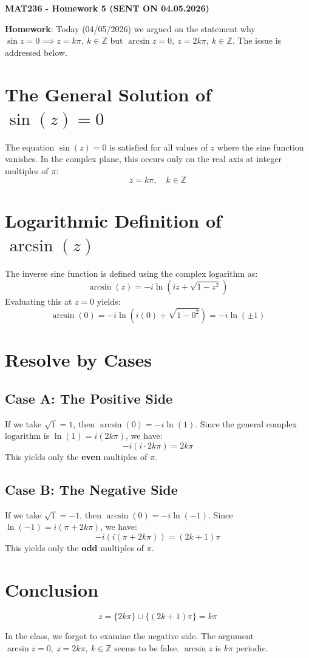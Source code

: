 \documentclass[11pt]{article}
\begin{document}
\begin{center}
\large
\textbf{MAT236 - Homework 5 (SENT ON 04.05.2026)}
\end{center}

\noindent\textbf{Homework}: Today (04/05/2026) we argued on the statement why $\sin z=0\implies z=k\pi,\:k\in\mathbb{Z}$ but $\arcsin z=0,\:z=2k\pi,\:k\in\mathbb{Z}$. The issue is addressed below.

\section{The General Solution of $\sin(z) = 0$}
The equation $\sin(z) = 0$ is satisfied for all values of $z$ where the sine function vanishes. In the complex plane, this occurs only on the real axis at integer multiples of $\pi$:
\begin{equation*}
z = k\pi, \quad k \in \mathbb{Z}
\end{equation*}

\section{Logarithmic Definition of $\arcsin(z)$}
The inverse sine function is defined using the complex logarithm as:
\begin{equation*}
\arcsin(z) = -i \ln\left(iz + \sqrt{1 - z^2}\right)
\end{equation*}
Evaluating this at $z = 0$ yields:
\begin{equation*}
\arcsin(0) = -i \ln\left(i(0) + \sqrt{1 - 0^2}\right) = -i \ln(\pm 1)
\end{equation*}

\section{Resolve by Cases}

\subsection{Case A: The Positive Side}
If we take $\sqrt{1} = 1$, then $\arcsin(0) = -i \ln(1)$. Since the general complex logarithm is $\ln(1) = i(2k\pi)$, we have:
\begin{equation*}
-i(i \cdot 2k\pi) = 2k\pi
\end{equation*}
This yields only the \textbf{even} multiples of $\pi$.

\subsection{Case B: The Negative Side}
If we take $\sqrt{1} = -1$, then $\arcsin(0) = -i \ln(-1)$. Since $\ln(-1) = i(\pi + 2k\pi)$, we have:
\begin{equation*}
-i(i(\pi + 2k\pi)) = (2k + 1)\pi
\end{equation*}
This yields only the \textbf{odd} multiples of $\pi$.

\section{Conclusion}
\begin{equation*}
z = \{2k\pi\} \cup \{(2k+1)\pi\} = k\pi
\end{equation*}

\noindent In the class, we forgot to examine the negative side. The argument $\arcsin z=0,\:z=2k\pi,\:k\in\mathbb{Z}$ seems to be false. $\arcsin z$ is $\boxed{k\pi}$ periodic.
\end{document}
